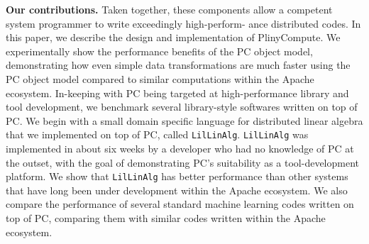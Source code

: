 \vspace{5 pt}
\noindent
\textbf{Our contributions.}
Taken together, these components allow a competent system programmer
to write exceedingly high-perform- ance distributed codes.
In this paper, we describe the design and implementation of PlinyCompute.  We experimentally show the performance benefits of the PC object model, 
demonstrating how even simple data transformations are much faster using the PC object model compared to similar computations within the 
Apache ecosystem.
In-keeping with PC being targeted at high-performance
library and tool development,
we benchmark several library-style softwares written on top of PC.  We begin with a small domain specific language
for distributed linear algebra that we implemented on top of PC, called \texttt{LilLinAlg}.  \texttt{LilLinAlg} was implemented in about six weeks by a developer
who had no knowledge of PC at the outset, with the goal of demonstrating PC's suitability as a tool-development platform.  
We show that \texttt{LilLinAlg} has better performance than other systems that have long been under development
within the Apache ecosystem.   
We also compare the performance of several standard machine learning codes written on top of PC, comparing them with similar
codes written within the Apache ecosystem.  

